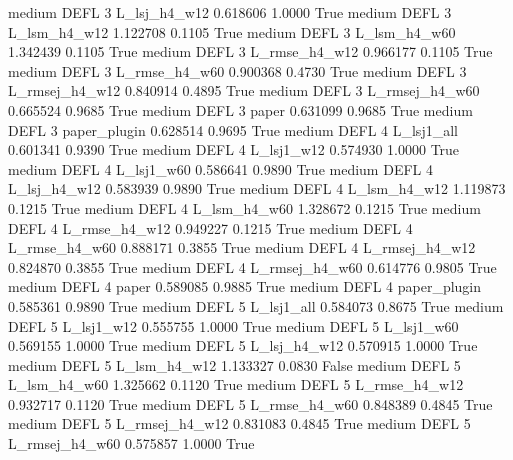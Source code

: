     medium     DEFL                 3   L_lsj_h4_w12   0.618606      1.0000    True
    medium     DEFL                 3   L_lsm_h4_w12   1.122708      0.1105    True
    medium     DEFL                 3   L_lsm_h4_w60   1.342439      0.1105    True
    medium     DEFL                 3  L_rmse_h4_w12   0.966177      0.1105    True
    medium     DEFL                 3  L_rmse_h4_w60   0.900368      0.4730    True
    medium     DEFL                 3 L_rmsej_h4_w12   0.840914      0.4895    True
    medium     DEFL                 3 L_rmsej_h4_w60   0.665524      0.9685    True
    medium     DEFL                 3          paper   0.631099      0.9685    True
    medium     DEFL                 3   paper_plugin   0.628514      0.9695    True
    medium     DEFL                 4     L_lsj1_all   0.601341      0.9390    True
    medium     DEFL                 4     L_lsj1_w12   0.574930      1.0000    True
    medium     DEFL                 4     L_lsj1_w60   0.586641      0.9890    True
    medium     DEFL                 4   L_lsj_h4_w12   0.583939      0.9890    True
    medium     DEFL                 4   L_lsm_h4_w12   1.119873      0.1215    True
    medium     DEFL                 4   L_lsm_h4_w60   1.328672      0.1215    True
    medium     DEFL                 4  L_rmse_h4_w12   0.949227      0.1215    True
    medium     DEFL                 4  L_rmse_h4_w60   0.888171      0.3855    True
    medium     DEFL                 4 L_rmsej_h4_w12   0.824870      0.3855    True
    medium     DEFL                 4 L_rmsej_h4_w60   0.614776      0.9805    True
    medium     DEFL                 4          paper   0.589085      0.9885    True
    medium     DEFL                 4   paper_plugin   0.585361      0.9890    True
    medium     DEFL                 5     L_lsj1_all   0.584073      0.8675    True
    medium     DEFL                 5     L_lsj1_w12   0.555755      1.0000    True
    medium     DEFL                 5     L_lsj1_w60   0.569155      1.0000    True
    medium     DEFL                 5   L_lsj_h4_w12   0.570915      1.0000    True
    medium     DEFL                 5   L_lsm_h4_w12   1.133327      0.0830   False
    medium     DEFL                 5   L_lsm_h4_w60   1.325662      0.1120    True
    medium     DEFL                 5  L_rmse_h4_w12   0.932717      0.1120    True
    medium     DEFL                 5  L_rmse_h4_w60   0.848389      0.4845    True
    medium     DEFL                 5 L_rmsej_h4_w12   0.831083      0.4845    True
    medium     DEFL                 5 L_rmsej_h4_w60   0.575857      1.0000    True
